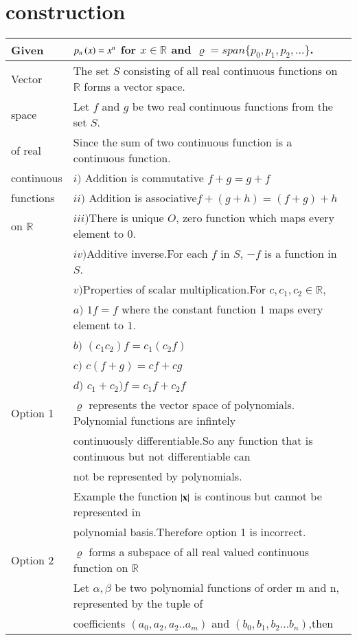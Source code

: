 \documentclass[journal,12pt]{IEEEtran}
\begin{document}
\section{construction}
\renewcommand{\thetable}{1}
\begin{longtable}{|l|l|}
    \hline
    Given & $p_n\left(x\right)=x^n$ for $x\in\mathbb{R}$ and $\varrho=span\{p_0,p_1,p_2,...\}$.\\
    \hline
    Vector& The set $S$ consisting of all real continuous functions on $\mathbb{R}$ forms a vector space.\\
    space&Let $f$ and $g$ be two real continuous functions from the set $S$.\\
    of real&Since the sum of two continuous function is a continuous function.\\
    continuous&$i)$ Addition is commutative $f+g=g+f$\\
    functions&$ii)$ Addition is associative$f+(g+h)=(f+g)+h$\\
    on $\mathbb{R}$&$iii)$There is unique $O$, zero function which maps every element to 0.\\
    &$iv)$Additive inverse.For each $f$ in $S$, $-f$ is a function in $S$.\\
    &$v)$Properties of scalar multiplication.For $c,c_1,c_2\in \mathbb{R}$,\\
    &\qquad $a)$ $1f=f$ where the constant function $1$ maps every element to $1$.\\
    &\qquad $b)$ $(c_1c_2)f=c_1(c_2f)$\\
    &\qquad $c)$ $c(f+g)=cf+cg$\\
    &\qquad $d)$ $c_1+c_2)f=c_1f+c_2f$\\
    \hline
    Option 1& $\varrho$ represents the vector space of polynomials. Polynomial functions are infintely \\
    & continuously differentiable.So any function that is continuous but not differentiable can \\
    & not be represented by polynomials.\\
    & Example the function $\mathbf{\left\vert x\right\vert}$ is continous but cannot be represented in \\
    &polynomial basis.Therefore option 1 is incorrect.\\
    \hline
    Option 2& $\varrho$ forms a subspace of all real valued continuous function on $\mathbb{R}$\\
    &Let $\alpha,\beta$ be two polynomial functions of order m and n, represented by the tuple of\\ &coefficients $(a_0,a_2,a_2..a_m)$ and $(b_0,b_1,b_2...b_n)$,then\\

\end{longtable}
\end{document}
